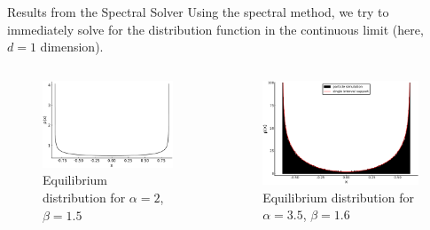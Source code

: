 \documentclass[aspectratio=169, hyperref={colorlinks=true}]{beamer}
\begin{document}
  \begin{frame}{Results from the Spectral Solver}
    \vspace{0.4cm}
    Using the spectral method, we try to immediately solve for the distribution function in the continuous limit (here, $d = 1$ dimension).
    \vspace{0.4cm}

    \begin{columns}
      \begin{column}{0.5\textwidth}
        \begin{figure}[H]
          \centering
          \includegraphics[width=0.9\linewidth]{figures/a2b1-5-measure.pdf}
          \caption*{Equilibrium distribution for $\alpha = 2$, $\beta = 1.5$}
        \end{figure}
      \end{column}
      \begin{column}{0.5\textwidth}
        \begin{figure}[H]
          \centering
          \includegraphics[width=0.9\linewidth]{figures/a35b16_supplement_3k.pdf}
          \caption*{Equilibrium distribution for $\alpha = 3.5$, $\beta = 1.6$}
        \end{figure}
      \end{column}
    \end{columns}
  \end{frame}
\end{document}
